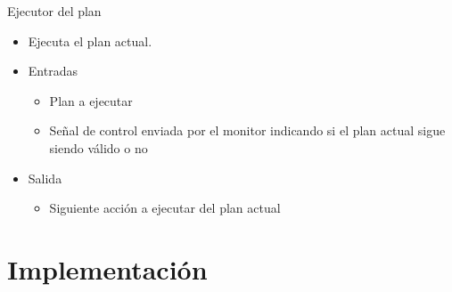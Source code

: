 \documentclass[11pt]{beamer}    %
\begin{document}
    \begin{frame}{Ejecutor del plan}
        \begin{itemize}
            \item Ejecuta el plan actual.
            \item \alert{Entradas}
            \begin{itemize}
                \item Plan a ejecutar
                \item Señal de control enviada por el monitor indicando si
                el plan actual sigue siendo válido o no
            \end{itemize}
            \item \alert{Salida}
            \begin{itemize}
                \item Siguiente acción a ejecutar del plan actual
            \end{itemize}
        \end{itemize}
    \end{frame}

    \section{Implementación}
\end{document}
